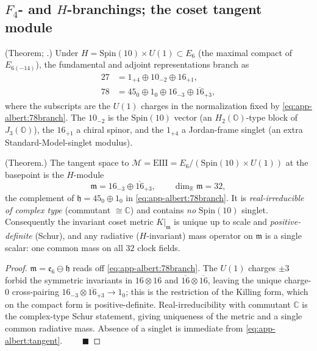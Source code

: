 \subsection{$F_4$- and $H$-branchings; the coset tangent module}
\label{sec:app-albert:branch}

\begin{theorem}\label{thm:app-albert:F4E6}
\textup{(Theorem; \cite{Baez:2002,Springer:2000}.)}
Under $H=\mathrm{Spin}(10)\times U(1)\subset E_6$ (the maximal compact of
$E_{6(-14)}$), the fundamental and adjoint representations branch as
\begin{align}
  27 &= 1_{+4}\oplus 10_{-2}\oplus 16_{+1},
  \label{eq:app-albert:27branch}\\
  78 &= 45_{0}\oplus 1_{0}\oplus 16_{-3}\oplus \overline{16}_{+3},
  \label{eq:app-albert:78branch}
\end{align}
where the subscripts are the $U(1)$ charges in the normalization fixed by
\eqref{eq:app-albert:78branch}. The $10_{-2}$ is the $\mathrm{Spin}(10)$ vector
(an $H_2(\mathbb O)$-type block of $J_3(\mathbb O)$), the $16_{+1}$ a chiral
spinor, and the $1_{+4}$ a Jordan-frame singlet (an extra Standard-Model-singlet
modulus).
\end{theorem}

\begin{corollary}\label{cor:app-albert:tangent}
\textup{(Theorem.)}
The tangent space to $\mathcal M=\mathrm{EIII}=E_6/(\mathrm{Spin}(10)\times U(1))$
at the basepoint is the $H$-module
\begin{equation}\label{eq:app-albert:tangent}
  \mathfrak m=16_{-3}\oplus\overline{16}_{+3},
  \qquad \dim_{\mathbb R}\mathfrak m=32,
\end{equation}
the complement of $\mathfrak h=45_0\oplus1_0$ in
\eqref{eq:app-albert:78branch}. It is \emph{real-irreducible of complex type}
(commutant $\cong\mathbb C$) and contains \emph{no} $\mathrm{Spin}(10)$ singlet.
Consequently the invariant coset metric $K|_{\mathfrak m}$ is unique up to scale
and \emph{positive-definite} (Schur), and any radiative ($H$-invariant)
mass operator on $\mathfrak m$ is a single scalar: one common mass on all $32$
clock fields.
\end{corollary}

\begin{proof}
$\mathfrak m=\mathfrak e_6\ominus\mathfrak h$ reads off
\eqref{eq:app-albert:78branch}. The $U(1)$ charges $\pm3$ forbid the symmetric
invariants in $16\otimes16$ and $\overline{16}\otimes\overline{16}$, leaving the
unique charge-$0$ cross-pairing $16_{-3}\otimes\overline{16}_{+3}\to1_0$; this is
the restriction of the Killing form, which on the compact form is
positive-definite. Real-irreducibility with commutant $\mathbb C$ is the
complex-type Schur statement, giving uniqueness of the metric and a single common
radiative mass. Absence of a singlet is immediate from
\eqref{eq:app-albert:tangent}. $\qquad\blacksquare$
\end{proof}

